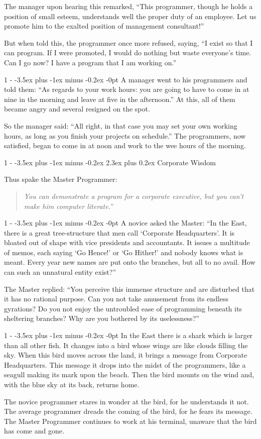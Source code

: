 \documentclass[12pt,letterpaper]{article}
\makeatletter
\newlength{\intomargin}\setlength{\intomargin}{25pt}
\renewcommand{\section}{%
\@startsection{section}%
{1}%
{-\intomargin}%
{-3.5ex plus -1ex minus -0.2ex}%
{2.3ex plus 0.2ex}%
{\normalfont\Large\bfseries}%
}
\renewcommand{\subsection}{%
\@startsection{subsection}%
{1}%
{-\intomargin}%
{-3.5ex plus -1ex minus -0.2ex}%
{-0pt}%
{\normalfont\large\bfseries}%
}
\newcommand{\book}[2]{\section{#1}\par\hspace{-\intomargin}Thus spake the Master Programmer:%
\begin{quotation}\noindent\llap{``}\textsl{#2}''\end{quotation}\medskip}
\newcommand{\sect}{\subsection{}}
\makeatother
\begin{document}
The manager upon hearing this remarked, ``This programmer, though he
holds a position of small esteem, understands well the proper duty of
an employee. Let us promote him to the exalted position of management
consultant!''

But when told this, the programmer once more refused, saying, ``I
exist so that I can program. If I were promoted, I would do nothing
but waste everyone's time. Can I go now? I have a program that I am
working on.''

\sect
A manager went to his programmers and told them: ``As regards to your
work hours: you are going to have to come in at nine in the morning
and leave at five in the afternoon.'' At this, all of them became
angry and several resigned on the spot.

So the manager said: ``All right, in that case you may set your own
working hours, as long as you finish your projects on schedule.'' The
programmers, now satisfied, began to come in at noon and work to the
wee hours of the morning.

\book{Corporate Wisdom}%
{You can demonstrate a program for a corporate executive,
but you can't make him computer literate.}

\sect
A novice asked the Master: ``In the East, there is a great
tree-structure that men call `Corporate Headquarters'. It is bloated
out of shape with vice presidents and accountants. It issues a
multitude of memos, each saying `Go Hence!' or `Go Hither!' and nobody
knows what is meant. Every year new names are put onto the branches,
but all to no avail. How can such an unnatural entity exist?''

The Master replied: ``You perceive this immense structure and are
disturbed that it has no rational purpose. Can you not take amusement
from its endless gyrations? Do you not enjoy the untroubled ease of
programming beneath its sheltering branches? Why are you bothered by
its uselessness?''

\sect
In the East there is a shark which is larger than all other fish. It
changes into a bird whose wings are like clouds filling the sky. When
this bird moves across the land, it brings a message from Corporate
Headquarters. This message it drops into the midst of the programmers,
like a seagull making its mark upon the beach. Then the bird mounts on
the wind and, with the blue sky at its back, returns home.

The novice programmer stares in wonder at the bird, for he understands
it not. The average programmer dreads the coming of the bird, for he
fears its message. The Master Programmer continues to work at his
terminal, unaware that the bird has come and gone.
\end{document}
